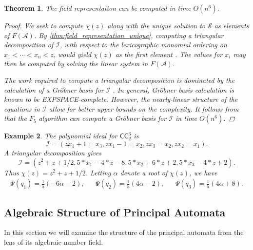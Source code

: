 \documentclass[12pt, letterpaper]{article}
\newcommand{\paren}[1]{\left(#1\right)}
\newcommand{\A}{\mathcal A}
\newcommand{\CC}{\mathsf{CC}}
\newcommand{\I}{\mathcal I}
\renewcommand{\S}{\mathcal S}
\newtheorem{thm}{Theorem}[section]
\newtheorem{example}[thm]{Example}
\begin{document}
\begin{thm}\label{thm:field_representation_efficient}
    The field representation can be computed in time $O(n^6)$.
    \begin{proof}
        We seek to compute $\chi(z)$ along with the unique solution to $\S$ as
        elements of $F(\A)$. By \cref{thm:field_representation_unique},
        computing a triangular decomposition of $\I$, with respect to the
        lexicographic monomial ordering on $x_1 < \cdots < x_n < z$, would
        yield $\chi(z)$ as the first element \cite{LAZARD1992117}.  The values
        for $x_i$ may then be computed by solving the linear system in $F(\A)$.

        The work required to compute a triangular decomposition is dominated by
        the calculation of a Gr\"obner basis for $\I$ \cite{LAZARD1992117}.  In
        general, Gr\"obner basis calculation is known to be EXPSPACE-complete.
        However, the nearly-linear structure of the equations in $\I$ allow for
        better upper bounds on the complexity. It follows from
        \cite{faugere2011grobner} that the $F_5$ algorithm can compute a
        Gr\"obner basis for $\I$ in time $O(n^6)$.
    \end{proof}
\end{thm}

\begin{example}\label{example:field-cc-3-2}
    The polynomial ideal for $\CC^3_2$ is
    \[
        \I = (zx_1 + 1 = x_3, zx_1 - 1 = x_2, zx_3 = x_2, z x_2 = x_1).
    \]
    A triangular decomposition gives
    \[
        \I = (z^2 + z + 1/2, 5*x_1 - 4*z - 8, 5*x_2 + 6*z + 2, 5*x_3 - 4*z + 2).
    \]
    Thus $\chi(z) = z^2 + z + 1/2$. Letting $\alpha$ denote a root of
    $\chi(z)$, we have
    \begin{align*}
        \Psi(q_1) = \frac{1}{5}\paren{-6 \alpha - 2},
        &&
        \Psi(q_2) = \frac{1}{5}\paren{4 \alpha - 2},
        &&
        \Psi(q_3) = \frac{1}{5}\paren{4 \alpha + 8}.
    \end{align*}
\end{example}

\subsection{Algebraic Structure of Principal Automata}\label{sec:field-principal}
In this section we will examine the structure of the principal automata
from the lens of its algebraic number field.
\end{document}
